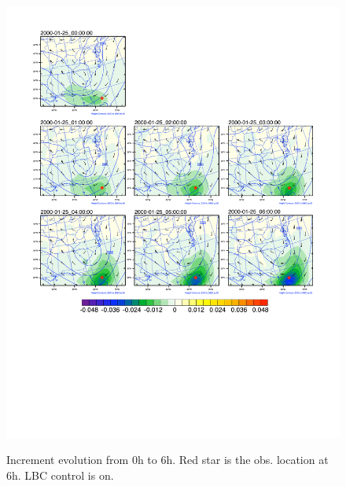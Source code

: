 \documentclass[12pt]{article}
\begin{document}
\begin{figure}[t]
  \noindent\includegraphics[width=45pc, trim=10 200 10 10, clip, angle=0]{boundarylbcjcdf.pdf}\\
  \caption{Increment evolution from 0h to 6h. Red star is the obs. location at 6h. LBC control is on.}\label{f4}
\end{figure}
%
\end{document}
